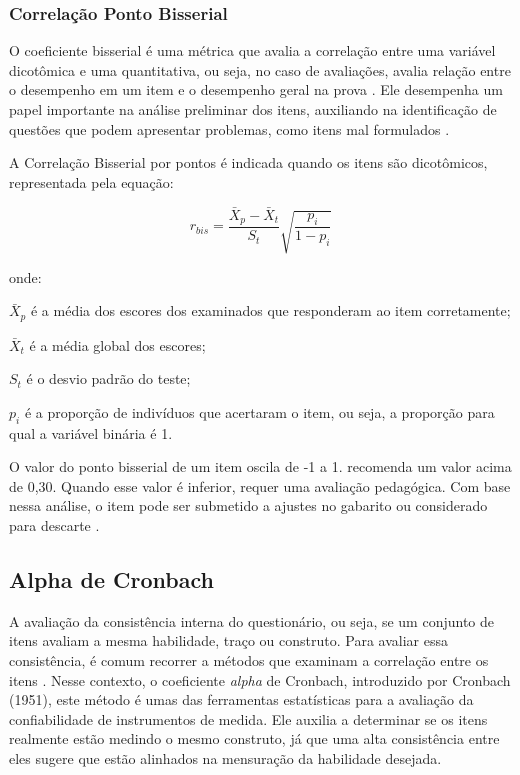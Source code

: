 \subsubsection{Correlação Ponto Bisserial}

O coeficiente bisserial é uma métrica que avalia a correlação entre uma variável dicotômica e uma quantitativa, ou seja, no caso de avaliações, avalia relação entre o desempenho em um item e o desempenho geral na prova \cite{BORGATTO2012}. Ele desempenha um papel importante na análise preliminar dos itens, auxiliando na identificação de questões que podem apresentar problemas, como itens mal formulados \cite{de2000teoria}.

A Correlação Bisserial por pontos é indicada quando os itens são dicotômicos, representada pela equação:


\begin{equation}
	r_{bis} = \frac{\bar{X}_p - \bar{X}_t}{S_t}
	\sqrt{\frac{p_i}{1 - p_i}}
\end{equation}

onde:


\noindent $ \bar{X}_p $ é a média dos escores dos examinados que responderam ao item corretamente;

\noindent $ \bar{X}_t $ é a média global dos escores;

\noindent $ S_t $ é o desvio padrão do teste;

\noindent $ p_i $  é a proporção de indivíduos que acertaram o item, ou seja, a proporção para qual a variável binária é 1.


O valor do ponto bisserial de um item oscila de -1 a 1. \cite{pasquali2003} recomenda um valor acima de 0,30. Quando esse valor é inferior, requer uma avaliação pedagógica. Com base nessa análise, o item pode ser submetido a ajustes no gabarito ou considerado para descarte \cite{andrade2010uso}.


\subsection{Alpha de Cronbach}

A avaliação da consistência interna do questionário, ou seja, se um conjunto de itens avaliam a mesma habilidade, traço ou construto. Para avaliar essa consistência, é comum recorrer a métodos que examinam a correlação entre os itens \cite{souza2017}. Nesse contexto, o coeficiente \textit{alpha} de Cronbach, introduzido por Cronbach (1951), este método é umas das ferramentas estatísticas para a avaliação da confiabilidade de instrumentos de medida. Ele auxilia  a determinar se os itens realmente estão medindo o mesmo construto, já que uma alta consistência entre eles sugere que estão alinhados na mensuração da habilidade desejada.

